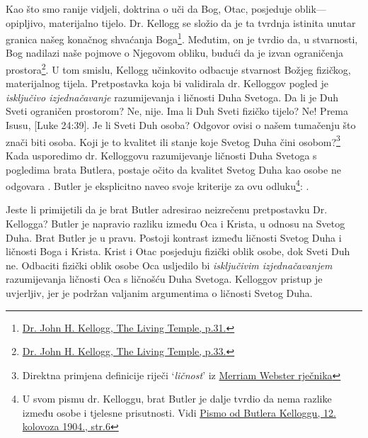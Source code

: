 Kao što smo ranije vidjeli, doktrina o  uči da Bog, Otac, posjeduje oblik—opipljivo, materijalno tijelo. Dr. Kellogg se složio da je ta tvrdnja istinita unutar granica našeg konačnog shvaćanja Boga\footnote{\href{https://archive.org/details/J.H.Kellogg.TheLivingTemple1903/page/n33/}{Dr. John H. Kellogg, The Living Temple, p.31.}}. Međutim, on je tvrdio da, u stvarnosti, Bog nadilazi naše pojmove o Njegovom obliku, budući da je izvan ograničenja prostora\footnote{\href{https://archive.org/details/J.H.Kellogg.TheLivingTemple1903/page/n33/}{Dr. John H. Kellogg, The Living Temple, p.33.}}. U tom smislu, Kellogg učinkovito odbacuje stvarnost Božjeg fizičkog, materijalnog tijela. Pretpostavka koja bi validirala dr. Kelloggov pogled je \textit{isključivo izjednačavanje} razumijevanja  i ličnosti Duha Svetoga. Da li je Duh Sveti ograničen prostorom? Ne, nije. Ima li Duh Sveti fizičko tijelo? Ne! Prema Isusu, [Luke 24:39]. Je li Sveti Duh osoba? Odgovor ovisi o našem tumačenju što znači biti osoba. Koji je to kvalitet ili stanje koje Svetog Duha čini osobom?\footnote{Direktna primjena definicije riječi ‘\textit{ličnost}’ iz \href{https://www.merriam-webster.com/dictionary/personality}{Merriam Webster rječnika}} Kada usporedimo dr. Kelloggovu razumijevanje ličnosti Duha Svetoga s pogledima brata Butlera, postaje očito da kvalitet Svetog Duha kao osobe ne odgovara . Butler je eksplicitno naveo svoje kriterije za ovu odluku\footnote{U svom pismu dr. Kelloggu, brat Butler je dalje tvrdio da nema razlike između osobe i tjelesne prisutnosti. Vidi \href{https://c7da.us/egwdl/Butler\%20to\%20Kellogg\%20Aug121904.pdf}{Pismo od Butlera Kelloggu, 12. kolovoza 1904., str.6}}: .

Jeste li primijetili da je brat Butler adresirao neizrečenu pretpostavku Dr. Kellogga? Butler je napravio razliku između Oca i Krista, u odnosu na Svetog Duha. Brat Butler je u pravu. Postoji kontrast između ličnosti Svetog Duha i ličnosti Boga i Krista. Krist i Otac posjeduju fizički oblik osobe, dok Sveti Duh ne. Odbaciti fizički oblik osobe Oca usljedilo bi \textit{isključivim izjednačavanjem} razumijevanja ličnosti Oca s ličnošću Duha Svetoga. Kelloggov pristup je uvjerljiv, jer je podržan valjanim argumentima o ličnosti Svetog Duha.

